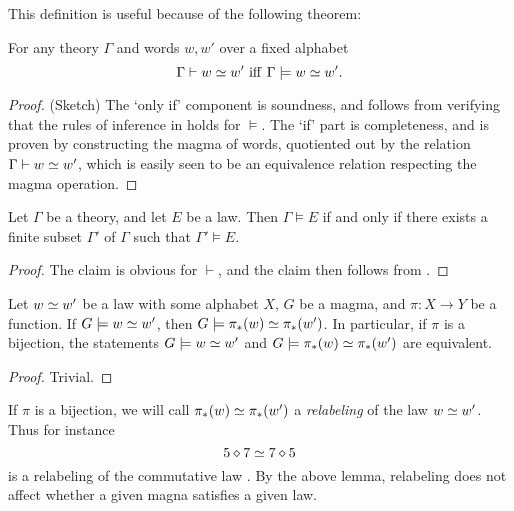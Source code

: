 This definition is useful because of the following theorem:

\begin{theorem}\label{sound-complete}\leanok{}
  For any theory $\Gamma$ and words $w, w'$ over a fixed alphabet
  $$ \Gamma\vdash w\simeq w'\ \mathrm{iff}\ \Gamma\models w\simeq w'.$$
\end{theorem}

\begin{proof}
  \leanok
  (Sketch) The `only if' component is soundness, and follows from verifying that the rules of inference in  holds for $\models$. The `if' part is completeness, and is proven by constructing the magma of words, quotiented out by the relation $\Gamma \vdash w \simeq w'$, which is easily seen to be an equivalence relation respecting the magma operation.
\end{proof}

\begin{corollary}\label{compactness-thm}
  Let $\Gamma$ be a theory, and let $E$ be a law.
  Then $\Gamma \models E$ if and only if there exists a finite subset $\Gamma'$ of $\Gamma$ such that $\Gamma' \models E$.
\end{corollary}

\begin{proof}
  The claim is obvious for $\vdash$, and the claim then follows from .
\end{proof}

\begin{lemma}[Pushforward]\label{push}
  Let $w \simeq w'$ be a law with some alphabet $X$, $G$ be a magma, and $\pi: X \to Y$ be a function.
  If $G \models w \simeq w'$, then $G \models \pi_*(w) \simeq \pi_*(w')$.
  In particular, if $\pi$ is a bijection, the statements $G \models w \simeq w'$ and $G \models \pi_*(w) \simeq \pi_*(w')$ are equivalent.
\end{lemma}

\begin{proof}
  Trivial.
\end{proof}

If $\pi$ is a bijection, we will call $\pi_*(w) \simeq \pi_*(w')$ a \emph{relabeling} of the law $w \simeq w'$. Thus for instance
$$ 5 \diamond 7 \simeq 7 \diamond 5$$
is a relabeling of the commutative law . By the above lemma, relabeling does not affect whether a given magna satisfies a given law.

